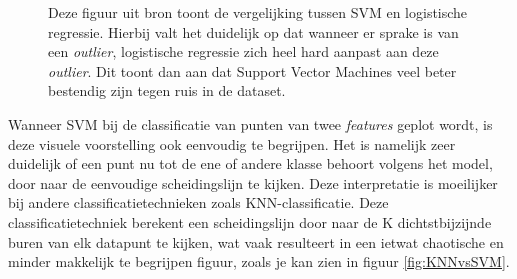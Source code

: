 \documentclass[twoside, kulak]{kulakreport}
\begin{document}
	\newpage
	
	\begin{figure}
		\centering
		\caption{Deze figuur uit bron \cite{Ramo_2017} toont de vergelijking tussen SVM en logistische regressie. Hierbij valt het duidelijk op dat wanneer er sprake is van een \textit{outlier}, logistische regressie zich heel hard aanpast aan deze \textit{outlier}. Dit toont dan aan dat Support Vector Machines veel beter bestendig zijn tegen ruis in de dataset. }
		\label{fig:LogistischeRegressieVsSVM}
	\end{figure}
	
	Wanneer SVM bij de classificatie van punten van twee \textit{features} geplot wordt, is deze visuele voorstelling ook eenvoudig te begrijpen. Het is namelijk zeer duidelijk of een punt nu tot de ene of andere klasse behoort volgens het model, door naar de eenvoudige scheidingslijn te kijken. Deze interpretatie is moeilijker bij andere classificatietechnieken zoals KNN-classificatie. Deze classificatietechniek berekent een scheidingslijn door naar de K dichtstbijzijnde buren van elk datapunt te kijken, wat vaak resulteert in een ietwat chaotische en minder makkelijk te begrijpen figuur, zoals je kan zien in figuur \ref{fig:KNNvsSVM}. 
	
\end{document}
